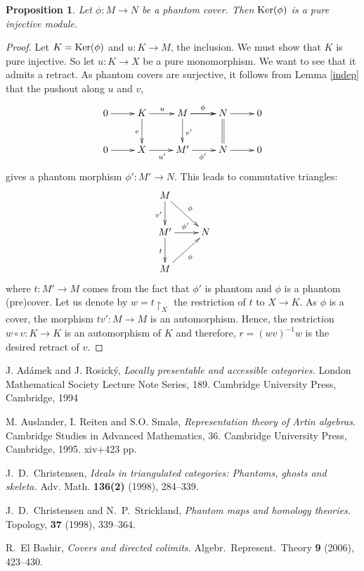 \documentclass[11pt]{amsart}
\newtheorem{prop}[teor]{Proposition}
\begin{document}
{\begin{prop}\label{kernel_pinj}
Let $\phi:M\to N$ be a phantom cover. Then ${\mathop{\rm Ker}\nolimits}(\phi)$ is a pure injective module.
\end{prop}
\begin{proof}
Let $K={\mathop{\rm Ker}\nolimits}(\phi)$ and $u:K\to M$, the inclusion. We must show that $K$ is pure injective. So let $u: K\to X$ be a pure monomorphism. We want to see that it admits a retract. As phantom covers are surjective, it follows from Lemma \ref{indep} that the pushout along $u$ and $v$,
$$\xymatrix{0\ar[r] & K\ar[d]_v\ar[r]^{u} & M \ar[r]^{\phi} \ar[d]^{v'}\ar[r] &N\ar@{=}[d]\ar[r] &0\\
0\ar[r] & X\ar[r]_{u'} & M' \ar[r]_{\phi'} &N\ar[r] &0   }$$
gives a phantom morphism $\phi':M'\to N$.
 This leads to commutative triangles:
$$\xymatrix{   M\ar[d]_{v'}\ar[dr]^{\phi}   &  \\
               M'\ar[r]^{\phi'}\ar[d]_{t}  & N \\
               M\ar[ur]_{\phi}       }$$ where $t:M'\to M$ comes from the fact that $\phi'$ is phantom and $\phi$ is a phantom (pre)cover. Let us denote by $w=t\upharpoonright_{X}$ the restriction of $t$ to $X\to K$.   As $\phi$ is a cover, the morphism $tv':M\to M$ is an automorphism. Hence, the restriction $w\circ v:K\to K$ is an automorphism of $K$ and therefore, $r=(wv)^{-1}w$ is the desired retract of $v$.
\end{proof}

\begin{thebibliography}{99}

{\sc J. Ad\'amek and J. Rosick\'y}, {\sl Locally presentable and accessible categories.} London Mathematical Society Lecture Note Series, 189. Cambridge University Press, Cambridge, 1994

 {\sc M. Auslander, I. Reiten and S.O. Smal\o,} {\sl Representation theory of Artin algebras}. Cambridge Studies in Advanced Mathematics, 36. Cambridge University Press, Cambridge, 1995. xiv+423 pp.

{\sc J.\ D.\ Christensen}, {\sl Ideals in triangulated categories: Phantoms, ghosts and skeleta.} Adv.
Math. {\bf 136(2)} (1998), 284--339.

{\sc J.\ D.\ Christensen and N.\ P.\ Strickland}, {\sl Phantom maps and homology theories.} Topology, {\bf 37} (1998), 339--364.

{\sc R.\ El Bashir}, {\sl Covers and directed colimits.} Algebr.\ Represent.\ Theory {\bf 9} (2006), 423--430.


\end{thebibliography}}
\end{document}

